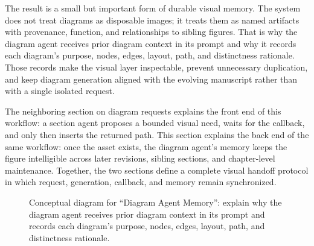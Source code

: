 \documentclass[11pt]{article}
\begin{document}
The result is a small but important form of durable visual memory. The system does not treat diagrams as disposable images; it treats them as named artifacts with provenance, function, and relationships to sibling figures. That is why the diagram agent receives prior diagram context in its prompt and why it records each diagram's purpose, nodes, edges, layout, path, and distinctness rationale. Those records make the visual layer inspectable, prevent unnecessary duplication, and keep diagram generation aligned with the evolving manuscript rather than with a single isolated request.

The neighboring section on diagram requests explains the front end of this workflow: a section agent proposes a bounded visual need, waits for the callback, and only then inserts the returned path. This section explains the back end of the same workflow: once the asset exists, the diagram agent's memory keeps the figure intelligible across later revisions, sibling sections, and chapter-level maintenance. Together, the two sections define a complete visual handoff protocol in which request, generation, callback, and memory remain synchronized.

\begin{figure}[htbp]
\centering

\caption{Conceptual diagram for ``Diagram Agent Memory'': explain why the diagram agent receives prior diagram context in its prompt and records each diagram's purpose, nodes, edges, layout, path, and distinctness rationale.}
\end{figure}
\end{document}

